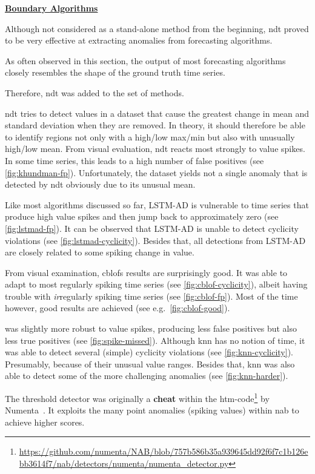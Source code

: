 \bigskip
{\large\uline{\textbf{Boundary Algorithms}}}\\
\begin{description}[style=unboxed,leftmargin=0cm]
    \item[Nonparametric Dynamic Thresholding~\cite{Hundman.2018}] Although not
    considered as a stand-alone method from the beginning, \gls{ndt} proved to be
    very effective at extracting anomalies from forecasting algorithms.
    
    As often observed in this section, the output of most forecasting algorithms
    closely resembles the shape of the ground truth time series.
    
    Therefore, \gls{ndt} was added to the set of methods.
    
    \gls{ndt} tries to detect values in a dataset that cause the greatest change
    in mean and standard deviation when they are removed. In theory, it should
    therefore be able to identify regions not only with a high/low max/min but also
    with unusually high/low mean. From visual evaluation, \gls{ndt} reacts most
    strongly to value spikes. In some time series, this leads to a high number
    of false positives (see \cref{fig:khundman-fp}). Unfortunately, the dataset
    yields not a single anomaly that is detected by \gls{ndt} obviously due to
    its unusual mean.
    \item[LSTM-AD] Like most algorithms discussed so far, LSTM-AD is vulnerable
    to time series that produce high value spikes and then jump back to approximately
    zero (see \cref{fig:lstmad-fp}). It can be observed that LSTM-AD is unable to detect
    cyclicity violations (see \cref{fig:lstmad-cyclicity}). Besides that, all
    detections from LSTM-AD are closely related to some spiking change in
    value.
    \item[CBLOF] From visual examination, \gls{cblof}s results are surprisingly
    good. It was able to adapt to most regularly spiking time series (see \cref{fig:cblof-cyclicity}),
    albeit having trouble with \textit{ir}regularly spiking time series (see \cref{fig:cblof-fp}).
    Most of the time however, good results are achieved (see e.g.\ \cref{fig:cblof-good}).
    \item[kNN] was slightly more robust to value spikes, producing
    less false positives but also less true positives (see \cref{fig:spike-missed}).
    Although \gls{knn} has no notion of time, it was able to detect several
    (simple) cyclicity violations (see \cref{fig:knn-cyclicity}). Presumably,
    because of their unusual value ranges. Besides that, \gls{knn} was also able
    to detect some of the more challenging anomalies (see \cref{fig:knn-harder}).
    \item[Threshold Detector] The threshold detector was originally a \textbf{cheat}
    within the \gls{htm}-code\footnote{\url{https://github.com/numenta/NAB/blob/757b586b35a939645dd92f6f7c1b126ebb3614f7/nab/detectors/numenta/numenta_detector.py}}
    by Numenta~\cite{Lavin.2015,Ahmad.2017}. It exploits the many point anomalies
    (spiking values) within \gls{nab} to achieve higher scores.
    

\end{description}
